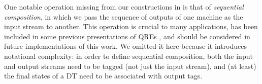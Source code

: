 %
%

One notable operation missing from our constructions in  is that of \emph{sequential composition}, in which we pass the sequence of outputs of one machine as the input stream to another. This operation is crucial to many applications, has been included in some previous presentations of QREs \cite{QRE, StreamQRE},
and should be considered in future implementations of this work. We omitted it here because it introduces notational complexity: in order to define sequential composition, both the input and output streams need to be tagged (not just the input stream), and (at least) the final states of a DT need to be associated with output tags.

